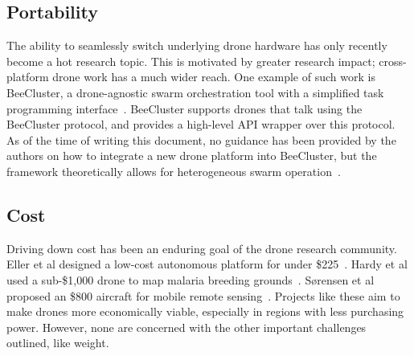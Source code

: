 \subsection{Portability}
The ability to seamlessly switch underlying drone hardware has only recently become a hot research topic. This is motivated by greater research impact; cross-platform drone work has a much wider reach. One example of such work is BeeCluster, a drone-agnostic swarm orchestration tool with a simplified task programming interface~\cite{He2020}. BeeCluster supports drones that talk using the BeeCluster protocol, and provides a high-level API wrapper over this protocol. As of the time of writing this document, no guidance has been provided by the authors on how to integrate a new drone platform into BeeCluster, but the framework theoretically allows for heterogeneous swarm operation~\cite{BeeCluster}.

\subsection{Cost}
Driving down cost has been an enduring goal of the drone research community. Eller et al designed a low-cost autonomous platform for under \$225~\cite{Eller2019}. Hardy et al used a sub-\$1,000 drone to map malaria breeding grounds~\cite{Hardy2017}. S{\o}rensen et al proposed an \$800 aircraft for mobile remote sensing~\cite{Sorensen2017}. Projects like these aim to make drones more economically viable, especially in regions with less purchasing power. However, none are concerned with the other important challenges outlined, like weight.   



